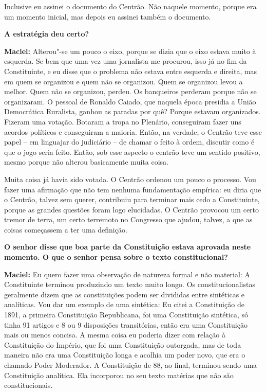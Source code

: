 Inclusive eu assinei o documento do Centrão. Não naquele momento, porque
era um momento inicial, mas depois eu assinei também o documento.

\textbf{A estratégia deu certo?}

\textbf{Maciel:} Alterou"-se um pouco o eixo, porque se dizia que o eixo
estava muito à esquerda. Se bem que uma vez uma jornalista me procurou,
isso já no fim da Constituinte, e eu disse que o problema não estava
entre esquerda e direita, mas em quem se organizou e quem não se
organizou. Quem se organizou levou a melhor. Quem não se organizou,
perdeu. Os banqueiros perderam porque não se organizaram. O pessoal de
Ronaldo Caiado, que naquela época presidia a União Democrática
Ruralista, ganhou as paradas por quê? Porque estavam organizados.
Fizeram uma votação. Botaram a tropa no Plenário, conseguiram fazer uns
acordos políticos e conseguiram a maioria. Então, na verdade, o Centrão
teve esse papel -- em linguajar do judiciário -- de chamar o feito à
ordem, discutir como é que o jogo seria feito. Então, sob esse aspecto o
centrão teve um sentido positivo, mesmo porque não alterou basicamente
muita coisa.

Muita coisa já havia sido votada. O Centrão ordenou um pouco o processo.
Vou fazer uma afirmação que não tem nenhuma fundamentação empírica: eu
diria que o Centrão, talvez sem querer, contribuiu para terminar mais
cedo a Constituinte, porque as grandes questões foram logo elucidadas. O
Centrão provocou um certo tremor de terra, um certo terremoto no
Congresso que ajudou, talvez, a que as coisas começassem a ter uma
definição.

\textbf{O senhor disse que boa parte da Constituição estava aprovada
neste momento. O que o senhor pensa sobre o texto constitucional?}

\textbf{Maciel:} Eu quero fazer uma observação de natureza formal e não
material: A Constituinte terminou produzindo um texto muito longo. Os
constitucionalistas geralmente dizem que as constituições podem ser
divididas entre sintéticas e analíticas. Vou dar um exemplo de uma
sintética: Eu citei a Constituição de 1891, a primeira Constituição
Republicana, foi uma Constituição sintética, só tinha 91 artigos e 8 ou
9 disposições transitórias, então era uma Constituição mais ou menos
concisa. A mesma coisa eu poderia dizer com relação à Constituição do
Império, que foi uma Constituição outorgada, mas de toda maneira não era
uma Constituição longa e acolhia um poder novo, que era o chamado Poder
Moderador. A Constituição de 88, ao final, terminou sendo uma
Constituição analítica. Ela incorporou no seu texto matérias que não são
constitucionais.

